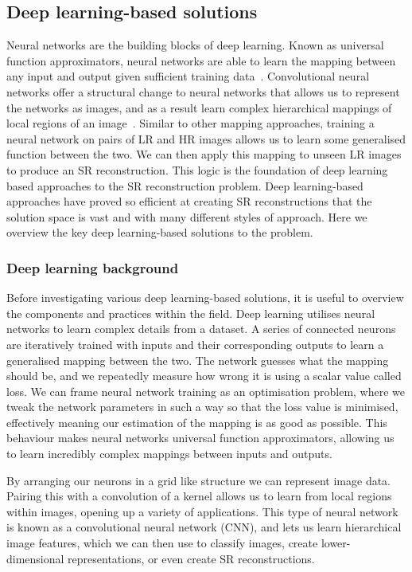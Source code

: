\subsection{Deep learning-based solutions}
Neural networks are the building blocks of deep learning. Known as universal function approximators, neural networks are able to learn the mapping between any input and output given sufficient training data~\cite{ref}. Convolutional neural networks offer a structural change to neural networks that allows us to represent the networks as images, and as a result learn complex hierarchical mappings of local regions of an image~\cite{ref}. Similar to other mapping approaches, training a neural network on pairs of LR and HR images allows us to learn some generalised function between the two. We can then apply this mapping to unseen LR images to produce an SR reconstruction. This logic is the foundation of deep learning based approaches to the SR reconstruction problem. Deep learning-based approaches have proved so efficient at creating SR reconstructions that the solution space is vast and with many different styles of approach. Here we overview the key deep learning-based solutions to the problem.

\subsubsection{Deep learning background}
Before investigating various deep learning-based solutions, it is useful to overview the components and practices within the field. Deep learning utilises neural networks to learn complex details from a dataset. A series of connected neurons are iteratively trained with inputs and their corresponding outputs to learn a generalised mapping between the two. The network guesses what the mapping should be, and we repeatedly measure how wrong it is using a scalar value called loss. We can frame neural network training as an optimisation problem, where we tweak the network parameters in such a way so that the loss value is minimised, effectively meaning our estimation of the mapping is as good as possible. This behaviour makes neural networks universal function approximators, allowing us to learn incredibly complex mappings between inputs and outputs.

By arranging our neurons in a grid like structure we can represent image data. Pairing this with a convolution of a kernel allows us to learn from local regions within images, opening up a variety of applications. This type of neural network is known as a convolutional neural network (CNN), and lets us learn hierarchical image features, which we can then use to classify images, create lower-dimensional representations, or even create SR reconstructions.

